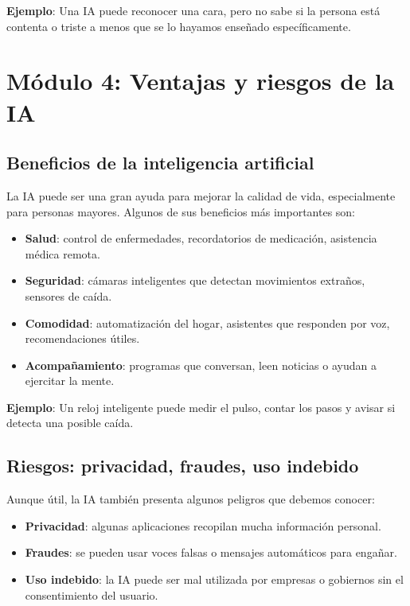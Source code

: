 \documentclass[12pt]{article}
\begin{document}
	\textbf{Ejemplo}: Una IA puede reconocer una cara, pero no sabe si la persona está contenta o triste a menos que se lo hayamos enseñado específicamente.
	
	\newpage
	
	\section{\textbf{\normalsize Módulo 4: Ventajas y riesgos de la IA}}
	
	\subsection*{Beneficios de la inteligencia artificial}
	La IA puede ser una gran ayuda para mejorar la calidad de vida, especialmente para personas mayores. Algunos de sus beneficios más importantes son:
	\begin{itemize}
		\item \textbf{Salud}: control de enfermedades, recordatorios de medicación, asistencia médica remota.
		\item \textbf{Seguridad}: cámaras inteligentes que detectan movimientos extraños, sensores de caída.
		\item \textbf{Comodidad}: automatización del hogar, asistentes que responden por voz, recomendaciones útiles.
		\item \textbf{Acompañamiento}: programas que conversan, leen noticias o ayudan a ejercitar la mente.
	\end{itemize}
	
	\textbf{Ejemplo}: Un reloj inteligente puede medir el pulso, contar los pasos y avisar si detecta una posible caída.
	
	\subsection*{Riesgos: privacidad, fraudes, uso indebido}
	Aunque útil, la IA también presenta algunos peligros que debemos conocer:
	\begin{itemize}
		\item \textbf{Privacidad}: algunas aplicaciones recopilan mucha información personal.
		\item \textbf{Fraudes}: se pueden usar voces falsas o mensajes automáticos para engañar.
		\item \textbf{Uso indebido}: la IA puede ser mal utilizada por empresas o gobiernos sin el consentimiento del usuario.
	\end{itemize}
	
\end{document}
